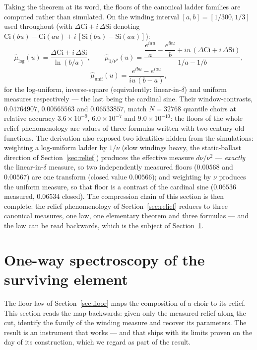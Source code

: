 \documentclass[11pt,a4paper]{article}
\begin{document}
Taking the theorem at its word, the floors of the canonical ladder
families are computed rather than simulated. On the winding interval
$[a,b] = [1/300, 1/3]$ used throughout (with
$\Delta\mathrm{Ci} + i\,\Delta\mathrm{Si}$ denoting
$\mathrm{Ci}(bu)-\mathrm{Ci}(au) + i\,[\mathrm{Si}(bu)-\mathrm{Si}(au)]$):
\begin{equation}
\hat{\mu}_{\log}(u) = \frac{\Delta\mathrm{Ci} + i\,\Delta\mathrm{Si}}
{\ln(b/a)},
\qquad
\hat{\mu}_{1/\nu^2}(u) = \frac{\dfrac{e^{iau}}{a} - \dfrac{e^{ibu}}{b}
+ iu\,(\Delta\mathrm{Ci} + i\,\Delta\mathrm{Si})}{1/a - 1/b},
\label{eq:closedfloors}
\end{equation}
\begin{equation}
\hat{\mu}_{\mathrm{unif}}(u) = \frac{e^{ibu} - e^{iau}}{iu\,(b-a)},
\label{eq:sincfloor}
\end{equation}
for the log-uniform, inverse-square (equivalently: linear-in-$\delta$)
and uniform measures respectively --- the last being the cardinal sine.
Their window-contrasts, $0.04764907$, $0.00565563$ and $0.06533857$,
match $N = 32768$ quantile choirs at relative accuracy
$3.6\times10^{-9}$, $6.0\times10^{-7}$ and $9.0\times10^{-10}$: the
floors of the whole relief phenomenology are values of three formulas
written with two-century-old functions. The derivation also exposed two
identities hidden from the simulations: weighting a log-uniform ladder
by $1/\nu$ (slow windings heavy, the static-ballast direction of
Section~\ref{sec:relief}) produces the effective measure
$d\nu/\nu^2$ --- \emph{exactly} the linear-in-$\delta$ measure, so two
independently measured floors ($0.00568$ and $0.00567$) are one
transform (closed value $0.00566$); and weighting by $\nu$ produces the
uniform measure, so that floor is a contrast of the cardinal sine
($0.06536$ measured, $0.06534$ closed). The compression chain of this
section is then complete: the relief phenomenology of
Section~\ref{sec:relief} reduces to three canonical measures, one law,
one elementary theorem and three formulas --- and the law can be read
backwards, which is the subject of Section~\ref{sec:spectroscopy}.

\section{One-way spectroscopy of the surviving element}
\label{sec:spectroscopy}

The floor law of Section~\ref{sec:floor} maps the composition of a choir
to its relief. This section reads the map backwards: given only the
measured relief along the cut, identify the family of the winding
measure and recover its parameters. The result is an instrument that
works --- and that ships with its limits proven on the day of its
construction, which we regard as part of the result.
\end{document}
